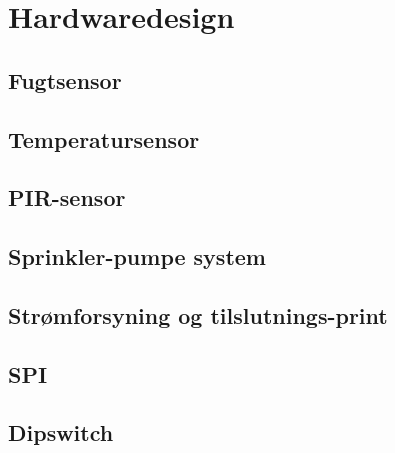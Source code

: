 \chapter{Hardwaredesign}

\section{Fugtsensor}


\section{Temperatursensor}


\section{PIR-sensor}


\section{Sprinkler-pumpe system}


\section{Strømforsyning og tilslutnings-print}


\section{SPI}


\section{Dipswitch}

